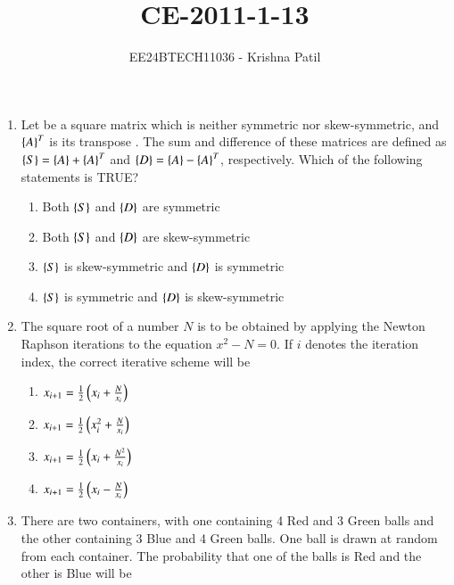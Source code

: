 \documentclass[journal]{IEEEtran}
\begin{document}

\vspace{3cm}

\title{CE-2011-1-13}
\author{EE24BTECH11036 - Krishna Patil}
{\let\newpage\relax\maketitle}
\begin{enumerate}
\item Let   be a square matrix which is neither symmetric nor skew-symmetric, and  ${\left\{A\right\}}^{T}$ is its transpose . The sum and difference of these matrices are defined as $\left\{S\right\} = \left\{A\right\} + {\left\{A\right\}}^{T}$  and  $\left\{D\right\} = \left\{A\right\} - {\left\{A\right\}}^{T}$, respectively. Which of the following statements is TRUE?
\begin{enumerate}
\item Both $\left\{S\right\}$ and $\left\{D\right\}$ are symmetric 
\item Both $\left\{S\right\}$ and $\left\{D\right\}$ are skew-symmetric
\item $\left\{S\right\}$ is skew-symmetric and $\left\{D\right\}$ is symmetric
\item $\left\{S\right\}$ is symmetric and $\left\{D\right\}$ is skew-symmetric
\end{enumerate}
\item The square root of a number $N$ is to be obtained by applying the Newton Raphson iterations to the equation $x^2 - N = 0$. If $i$ denotes the iteration index, the correct iterative scheme will be
\begin{enumerate}
    \item $x_{i+1} = \frac{1}{2} \left(x_i + \frac{N}{x_i}\right)$
\item $x_{i+1} = \frac{1}{2} \left(x_i^2 + \frac{N}{x_i}\right)$
\item $x_{i+1} = \frac{1}{2} \left(x_i + \frac{N^2}{x_i}\right)$
\item $x_{i+1} = \frac{1}{2} \left(x_i - \frac{N}{x_i}\right)$
\end{enumerate}
\item There are two containers, with one containing 4 Red and 3 Green balls and the other containing 3 Blue and 4 Green balls. One ball is drawn at random from each container. The probability that one of the balls is Red and the other is Blue will be
\begin{enumerate}

\end{enumerate}
\end{enumerate}
\end{document}

